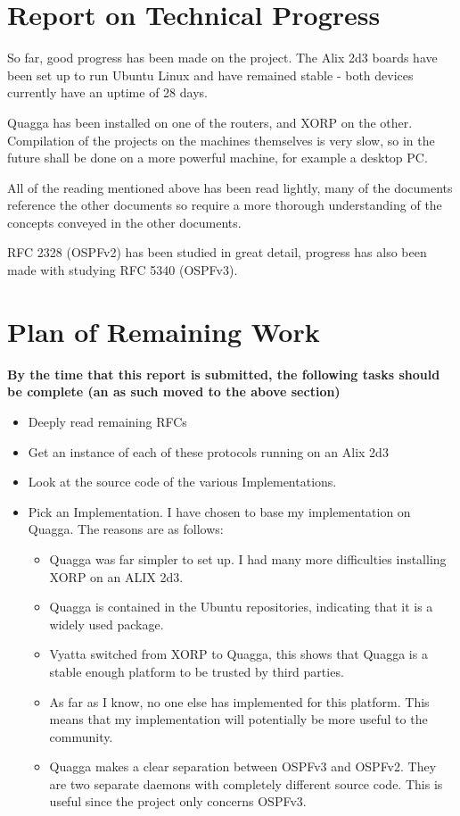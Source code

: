 \documentclass[12pt]{report}
\begin{document}
\chapter{Report on Technical Progress}

So far, good progress has been made on the project.  The Alix 2d3 boards have
been set up to run Ubuntu Linux and have remained stable - both devices
currently have an uptime of 28 days.

Quagga has been installed on one of the routers, and XORP on the other.
Compilation of the projects on the machines themselves is very slow, so in the
future shall be done on a more powerful machine, for example a desktop PC.

All of the reading mentioned above has been read lightly, many of the documents
reference the other documents so require a more thorough understanding of the
concepts conveyed in the other documents.

RFC 2328 (OSPFv2) has been studied in great detail, progress has also been made
with studying RFC 5340 (OSPFv3). 

\chapter{Plan of Remaining Work}

\em

\textbf{
	By the time that this report is submitted, the following tasks should be
	complete (an as such moved to the above section) 
}

\begin{itemize}

\item Deeply read remaining RFCs
\item Get an instance of each of these protocols running on an Alix 2d3
\item Look at the source code of the various Implementations. 
\item Pick an Implementation. I have chosen to base my implementation on Quagga.
The reasons are as follows: 

\begin{itemize}
\item Quagga was far simpler to set up. I had many more difficulties installing
XORP on an ALIX 2d3.
\item Quagga is contained in the Ubuntu repositories, indicating that it is a
widely used package. 
\item Vyatta switched from XORP to Quagga, this shows that Quagga is a stable
enough platform to be trusted by third parties. 
\item As far as I know, no one else has implemented for this platform. This means
that my implementation will potentially be more useful to the community. 
\item Quagga makes a clear separation between OSPFv3 and OSPFv2. They are two
separate daemons with completely different source code. This is useful since the
project only concerns OSPFv3.
\end{itemize}


\end{itemize}
\end{document}
